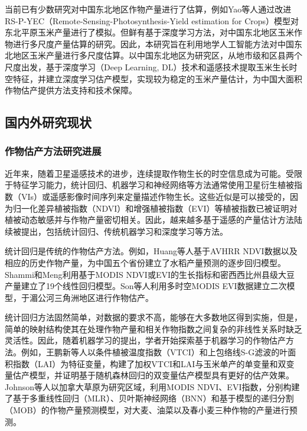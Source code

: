 \par 当前已有少数研究对中国东北地区作物产量进行了估算，例如Yao等人通过改进RS-P-YEC（Remote-Sensing-Photosynthesis-Yield estimation for Crops）模型对东北平原玉米产量进行了模拟\cite{yao2015estimation}。但鲜有基于深度学习方法，对中国东北地区玉米作物进行多尺度产量估算的研究。因此，本研究旨在利用地学人工智能方法对中国东北地区玉米产量进行多尺度估算。以中国东北地区为研究区，从地市级和区县两个尺度出发，基于深度学习（Deep Learning, DL）技术和遥感技术提取玉米生长时空特征，并建立深度学习估产模型，实现较为稳定的玉米产量估计，为中国大面积作物估产提供方法支持和技术保障。

\subsection{国内外研究现状}

\subsubsection{作物估产方法研究进展}

\par 近年来，随着卫星遥感技术的进步，连续提取作物生长的时空信息成为可能\cite{WEISS2020111402}。受限于特征学习能力，统计回归、机器学习和神经网络等方法通常使用卫星衍生植被指数（VIs）\cite{shammi2021use, stas2016comparison}或遥感影像时间序列\cite{8367850, nagy2018wheat}来定量描述作物生长。这些近似是可以接受的，因为归一化差异植被指数（NDVI）和增强植被指数（EVI）等植被指数已被证明对植被动态敏感\cite{sellers1987canopy, tucker1979red}并与作物产量密切相关\cite{shanahan2001use}。因此，越来越多基于遥感的产量估计方法陆续被提出，包括统计回归、传统机器学习和深度学习等方法。

\par 统计回归是传统的作物估产方法。例如，Huang等人\cite{huang2013remotely}基于AVHRR NDVI数据以及相应的历史作物产量，为中国五个省份建立了水稻产量预测的逐步回归模型。Shammi和Meng\cite{shammi2021use}利用基于MODIS NDVI或EVI的生长指标和密西西比州县级大豆产量建立了19个线性回归模型。Son等人\cite{son2014comparative}利用多时空MODIS EVI数据建立二次模型，于湄公河三角洲地区进行作物估产。

\par 统计回归方法固然简单，对数据的要求不高，能够在大多数地区得到实施，但是，简单的映射结构使其在处理作物产量和相关作物指数之间复杂的非线性关系时缺乏灵活性\cite{balaghi2008empirical, ren2008regional}。因此，随着机器学习的提出，学者开始探索基于机器学习的作物估产方法。例如，王鹏新等人\cite{NYJX201907026}以条件植被温度指数（VTCI）和上包络线S-G滤波的叶面积指数（LAI）为特征变量，构建了加权VTCI和LAI与玉米单产的单变量和双变量估产模型，并证明基于随机森林回归的双变量估产模型具有更好的估产效果。Johnson等人\cite{johnson2016crop}以加拿大草原为研究区域，利用MODIS NDVI、EVI指数，分别构建了基于多重线性回归（MLR）、贝叶斯神经网络（BNN）和基于模型的递归分割（MOB）的作物产量预测模型，对大麦、油菜以及春小麦三种作物的产量进行预测。

